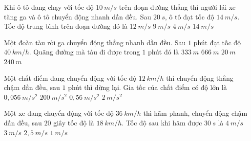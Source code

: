 \begin{vidu}%
Khi ô tô đang chạy với tốc độ $10\ m/s$ trên đoạn đường thẳng thì người lái xe tăng ga và ô tô chuyển động nhanh dần đều. Sau $20\ s$, ô tô đạt tốc độ $14\ m/s$. Tốc độ trung bình trên đoạn đường đó là
\choice
{\True $12\ m/s$}
{$9\ m/s$}
{$4\ m/s$}
{$14\ m/s$}
\end{vidu}
\begin{vidu} %
Một đoàn tàu rời ga chuyển động thẳng nhanh dần đều. Sau $1$ phút đạt tốc độ $40\ km/h$. Quãng đường mà tàu đi được trong $1$ phút đó là
\choice
{\True $333\ m$}
{$666\ m$}
{$20\ m$}
{$240\ m$}
\end{vidu}
\begin{vidu}%
Một chất điểm đang chuyển động với tốc độ $12\ km/h$ thì chuyển động thẳng chậm dần đều, sau $1$ phút thì dừng lại. Gia tốc của chất điểm có độ lớn là
\choice
{\True $0,056\ m/s^2$}
{$200\ m/s^2$}
{$0,56\ m/s^2$}
{$2\ m/s^2$}
\end{vidu}

\begin{vidu}%
Một xe đang chuyển động với tốc độ $36\ km/h$ thì hãm phanh, chuyển động chậm dần đều, sau $20$ giây tốc độ là $18\ km/h$. Tốc độ sau khi hãm được $30\ s$ là 
\choice
{$4\ m/s$}
{$3\ m/s$}
{\True $2,5\ m/s$}
{$1\ m/s$}
\end{vidu}

